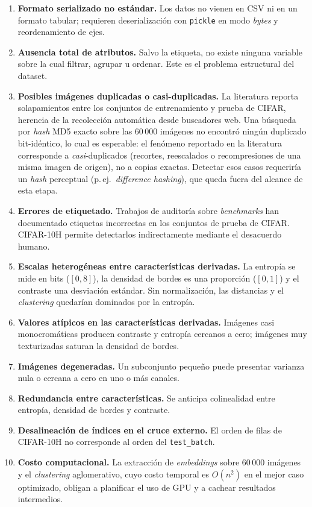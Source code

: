 \documentclass[11pt,a4paper]{article}
\begin{document}
\begin{enumerate}[leftmargin=*]
  \item \textbf{Formato serializado no estándar.} Los datos no vienen en CSV ni
  en un formato tabular; requieren deserialización con \texttt{pickle} en modo
  \emph{bytes} y reordenamiento de ejes.
  \item \textbf{Ausencia total de atributos.} Salvo la etiqueta, no existe
  ninguna variable sobre la cual filtrar, agrupar u ordenar. Este es el problema
  estructural del dataset.
  \item \textbf{Posibles imágenes duplicadas o casi-duplicadas.} La literatura
  reporta solapamientos entre los conjuntos de entrenamiento y prueba de CIFAR,
  herencia de la recolección automática desde buscadores web. Una búsqueda por
  \emph{hash} MD5 exacto sobre las 60\,000 imágenes no encontró ningún
  duplicado bit-idéntico, lo cual es esperable: el fenómeno reportado en la
  literatura corresponde a \emph{casi}-duplicados (recortes, reescalados o
  recompresiones de una misma imagen de origen), no a copias exactas. Detectar
  esos casos requeriría un \emph{hash} perceptual (p.\,ej.\ \emph{difference
  hashing}), que queda fuera del alcance de esta etapa.
  \item \textbf{Errores de etiquetado.} Trabajos de auditoría sobre
  \emph{benchmarks} han documentado etiquetas incorrectas en los conjuntos de
  prueba de CIFAR. CIFAR-10H permite detectarlos indirectamente mediante el
  desacuerdo humano.
  \item \textbf{Escalas heterogéneas entre características derivadas.} La
  entropía se mide en bits ($[0,8]$), la densidad de bordes es una proporción
  ($[0,1]$) y el contraste una desviación estándar. Sin normalización, las
  distancias y el \emph{clustering} quedarían dominados por la entropía.
  \item \textbf{Valores atípicos en las características derivadas.} Imágenes casi
  monocromáticas producen contraste y entropía cercanos a cero; imágenes muy
  texturizadas saturan la densidad de bordes.
  \item \textbf{Imágenes degeneradas.} Un subconjunto pequeño puede presentar
  varianza nula o cercana a cero en uno o más canales.
  \item \textbf{Redundancia entre características.} Se anticipa colinealidad
  entre entropía, densidad de bordes y contraste.
  \item \textbf{Desalineación de índices en el cruce externo.} El orden de filas
  de CIFAR-10H no corresponde al orden del \texttt{test\_batch}.
  \item \textbf{Costo computacional.} La extracción de \emph{embeddings} sobre
  60\,000 imágenes y el \emph{clustering} aglomerativo, cuyo costo temporal es
  $O(n^2)$ en el mejor caso optimizado, obligan a planificar el uso de GPU y a
  cachear resultados intermedios.
\end{enumerate}
\end{document}
